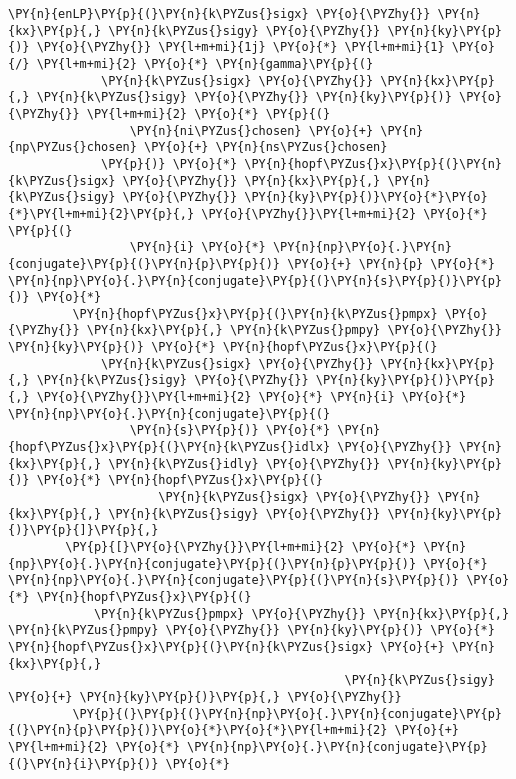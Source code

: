 \begin{Verbatim}[commandchars=\\\{\}]
         \PY{n}{enLP}\PY{p}{(}\PY{n}{k\PYZus{}sigx} \PY{o}{\PYZhy{}} \PY{n}{kx}\PY{p}{,} \PY{n}{k\PYZus{}sigy} \PY{o}{\PYZhy{}} \PY{n}{ky}\PY{p}{)} \PY{o}{\PYZhy{}} \PY{l+m+mi}{1j} \PY{o}{*} \PY{l+m+mi}{1} \PY{o}{/} \PY{l+m+mi}{2} \PY{o}{*} \PY{n}{gamma}\PY{p}{(}
             \PY{n}{k\PYZus{}sigx} \PY{o}{\PYZhy{}} \PY{n}{kx}\PY{p}{,} \PY{n}{k\PYZus{}sigy} \PY{o}{\PYZhy{}} \PY{n}{ky}\PY{p}{)} \PY{o}{\PYZhy{}} \PY{l+m+mi}{2} \PY{o}{*} \PY{p}{(}
                 \PY{n}{ni\PYZus{}chosen} \PY{o}{+} \PY{n}{np\PYZus{}chosen} \PY{o}{+} \PY{n}{ns\PYZus{}chosen}
             \PY{p}{)} \PY{o}{*} \PY{n}{hopf\PYZus{}x}\PY{p}{(}\PY{n}{k\PYZus{}sigx} \PY{o}{\PYZhy{}} \PY{n}{kx}\PY{p}{,} \PY{n}{k\PYZus{}sigy} \PY{o}{\PYZhy{}} \PY{n}{ky}\PY{p}{)}\PY{o}{*}\PY{o}{*}\PY{l+m+mi}{2}\PY{p}{,} \PY{o}{\PYZhy{}}\PY{l+m+mi}{2} \PY{o}{*} \PY{p}{(}
                 \PY{n}{i} \PY{o}{*} \PY{n}{np}\PY{o}{.}\PY{n}{conjugate}\PY{p}{(}\PY{n}{p}\PY{p}{)} \PY{o}{+} \PY{n}{p} \PY{o}{*} \PY{n}{np}\PY{o}{.}\PY{n}{conjugate}\PY{p}{(}\PY{n}{s}\PY{p}{)}\PY{p}{)} \PY{o}{*}
         \PY{n}{hopf\PYZus{}x}\PY{p}{(}\PY{n}{k\PYZus{}pmpx} \PY{o}{\PYZhy{}} \PY{n}{kx}\PY{p}{,} \PY{n}{k\PYZus{}pmpy} \PY{o}{\PYZhy{}} \PY{n}{ky}\PY{p}{)} \PY{o}{*} \PY{n}{hopf\PYZus{}x}\PY{p}{(}
             \PY{n}{k\PYZus{}sigx} \PY{o}{\PYZhy{}} \PY{n}{kx}\PY{p}{,} \PY{n}{k\PYZus{}sigy} \PY{o}{\PYZhy{}} \PY{n}{ky}\PY{p}{)}\PY{p}{,} \PY{o}{\PYZhy{}}\PY{l+m+mi}{2} \PY{o}{*} \PY{n}{i} \PY{o}{*} \PY{n}{np}\PY{o}{.}\PY{n}{conjugate}\PY{p}{(}
                 \PY{n}{s}\PY{p}{)} \PY{o}{*} \PY{n}{hopf\PYZus{}x}\PY{p}{(}\PY{n}{k\PYZus{}idlx} \PY{o}{\PYZhy{}} \PY{n}{kx}\PY{p}{,} \PY{n}{k\PYZus{}idly} \PY{o}{\PYZhy{}} \PY{n}{ky}\PY{p}{)} \PY{o}{*} \PY{n}{hopf\PYZus{}x}\PY{p}{(}
                     \PY{n}{k\PYZus{}sigx} \PY{o}{\PYZhy{}} \PY{n}{kx}\PY{p}{,} \PY{n}{k\PYZus{}sigy} \PY{o}{\PYZhy{}} \PY{n}{ky}\PY{p}{)}\PY{p}{]}\PY{p}{,}
        \PY{p}{[}\PY{o}{\PYZhy{}}\PY{l+m+mi}{2} \PY{o}{*} \PY{n}{np}\PY{o}{.}\PY{n}{conjugate}\PY{p}{(}\PY{n}{p}\PY{p}{)} \PY{o}{*} \PY{n}{np}\PY{o}{.}\PY{n}{conjugate}\PY{p}{(}\PY{n}{s}\PY{p}{)} \PY{o}{*} \PY{n}{hopf\PYZus{}x}\PY{p}{(}
            \PY{n}{k\PYZus{}pmpx} \PY{o}{\PYZhy{}} \PY{n}{kx}\PY{p}{,} \PY{n}{k\PYZus{}pmpy} \PY{o}{\PYZhy{}} \PY{n}{ky}\PY{p}{)} \PY{o}{*} \PY{n}{hopf\PYZus{}x}\PY{p}{(}\PY{n}{k\PYZus{}sigx} \PY{o}{+} \PY{n}{kx}\PY{p}{,}
                                               \PY{n}{k\PYZus{}sigy} \PY{o}{+} \PY{n}{ky}\PY{p}{)}\PY{p}{,} \PY{o}{\PYZhy{}}
         \PY{p}{(}\PY{p}{(}\PY{n}{np}\PY{o}{.}\PY{n}{conjugate}\PY{p}{(}\PY{n}{p}\PY{p}{)}\PY{o}{*}\PY{o}{*}\PY{l+m+mi}{2} \PY{o}{+} \PY{l+m+mi}{2} \PY{o}{*} \PY{n}{np}\PY{o}{.}\PY{n}{conjugate}\PY{p}{(}\PY{n}{i}\PY{p}{)} \PY{o}{*}

\end{Verbatim}
